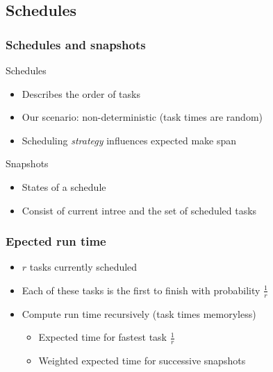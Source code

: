 \documentclass{beamer}
\begin{document}
\subsection{Schedules}
\label{sec:schedules}

\begin{frame}
  \frametitle{Schedules and snapshots}
  \begin{block}{Schedules}
    \begin{itemize}
    \item Describes the order of tasks
    \item Our scenario: non-deterministic (task times are random)
    \item Scheduling \emph{strategy} influences expected make span
    \end{itemize}
  \end{block}
  \begin{block}{Snapshots}
    \begin{itemize}
    \item States of a schedule
    \item Consist of current intree and the set of scheduled tasks
    \end{itemize}
  \end{block}
\end{frame}

\begin{frame}
  \frametitle{Epected run time}
  \begin{itemize}
  \item $r$ tasks currently scheduled
  \item Each of these tasks is the first to finish with probability $\frac{1}{r}$
  \item Compute run time recursively (task times memoryless)
    \begin{itemize}
    \item Expected time for fastest task $\frac{1}{r}$
    \item Weighted expected time for successive snapshots
    \end{itemize}
  \end{itemize}
\end{frame}
\end{document}
